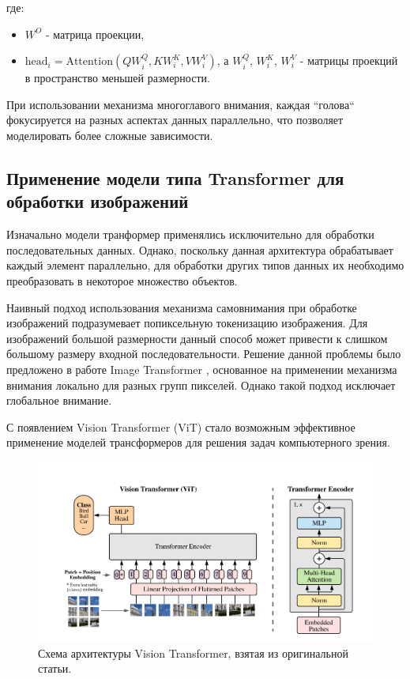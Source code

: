 где: 
\begin{itemize}
    \item $W^O$ - матрица проекции,
    \item $\text{head}_i = \text{Attention}(Q W_i^Q, K W_i^K, V W_i^V)$, а $W_i^Q$, $W_i^K$, $W_i^V$ - матрицы проекций в пространство меньшей размерности.
\end{itemize}

При использовании механизма многоглавого внимания, каждая ``голова`` фокусируется на разных аспектах данных параллельно, что позволяет моделировать более сложные зависимости.

\subsection{Применение модели типа Transformer для обработки изображений}

Изначально модели транформер применялись исключительно для обработки последовательных данных. Однако, поскольку данная архитектура обрабатывает каждый элемент параллельно, для обработки других типов данных их необходимо преобразовать в некоторое множество объектов. 

Наивный подход использования механизма самовнимания при обработке изображений подразумевает попиксельную токенизацию изображения. Для изображений большой размерности данный способ может привести к слишком большому размеру входной последовательности. Решение данной проблемы было предложено в работе Image Transformer \cite{image_transformer}, основанное на применении механизма внимания локально для разных групп пикселей. Однако такой подход исключает глобальное внимание.

С появлением Vision Transformer (ViT) \cite{vit} стало возможным эффективное применение моделей трансформеров для решения задач компьютерного зрения. 


\begin{figure}[H]
    \centering
    \includegraphics[width=1.0\textwidth]
    {images/domain_analysis/vit_scheme.png}
    \caption{Схема архитектуры Vision Transformer, взятая из оригинальной статьи.}
    \label{fig:vit-scheme}
\end{figure}


